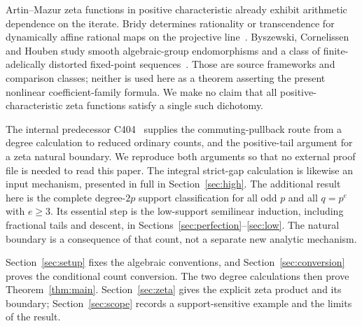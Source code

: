 Artin--Mazur zeta functions in positive characteristic already exhibit
arithmetic dependence on the iterate. Bridy determines rationality
or transcendence for dynamically affine rational maps on the
projective line~\cite{Bridy2016}. Byszewski, Cornelissen and Houben
study smooth algebraic-group endomorphisms and a class of
finite-adelically distorted fixed-point sequences~\cite{BCH2024}.
Those are source frameworks and comparison classes; neither is used
here as a theorem asserting the present nonlinear coefficient-family
formula. We make no claim that all positive-characteristic zeta
functions satisfy a single such dichotomy.

The internal predecessor C404~\cite{C404} supplies the commuting-pullback
route from a degree calculation to reduced ordinary counts, and the
positive-tail argument for a zeta natural boundary. We reproduce both
arguments so that no external proof file is needed to read this paper.
The integral strict-gap calculation is likewise an input mechanism,
presented in full in Section~\ref{sec:high}. The additional result here
is the complete degree-$2p$ support classification for all odd $p$ and
all $q=p^e$ with $e\ge3$. Its essential step is the low-support
semilinear induction, including fractional tails and descent, in
Sections~\ref{sec:perfection}--\ref{sec:low}. The natural boundary is
a consequence of that count, not a separate new analytic mechanism.

Section~\ref{sec:setup} fixes the algebraic conventions, and
Section~\ref{sec:conversion} proves the conditional count conversion.
The two degree calculations then prove Theorem~\ref{thm:main}.
Section~\ref{sec:zeta} gives the explicit zeta product and its boundary;
Section~\ref{sec:scope} records a support-sensitive example and the
limits of the result.
